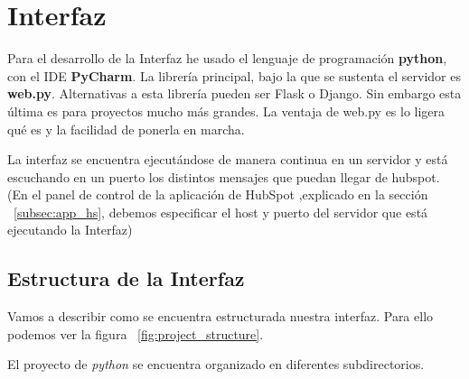 \section{Interfaz}


Para el desarrollo de la Interfaz he usado el lenguaje de programación \textbf{python}, con el IDE \textbf{PyCharm}. La librería principal, bajo la que se sustenta el servidor es \textbf{web.py}.
Alternativas a esta librería pueden ser Flask o Django. Sin embargo esta última es para proyectos mucho más grandes. La ventaja de web.py es lo ligera qué es y la facilidad de ponerla en marcha.

La interfaz se encuentra ejecutándose de manera continua en un servidor y está escuchando en un puerto los distintos mensajes que puedan llegar de hubspot.
(En el panel de control de la aplicación de HubSpot ,explicado en la sección ~\ref{subsec:app_hs}, debemos especificar el host y puerto del servidor que está ejecutando la Interfaz)


\subsection{Estructura de la Interfaz}
Vamos a describir como se encuentra estructurada nuestra interfaz. Para ello podemos ver la figura ~\ref{fig:project_structure}. 

El proyecto de \textit{python} se encuentra organizado en diferentes subdirectorios.

